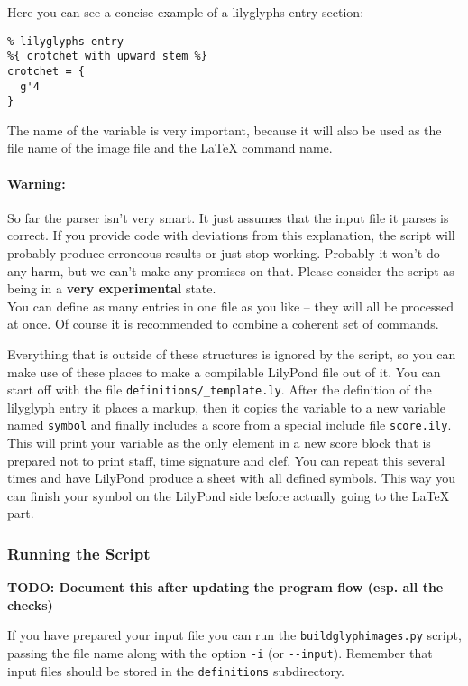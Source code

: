 \documentclass{article}
\begin{document}
Here you can see a concise example of a lilyglyphs entry section:

\begin{verbatim}
% lilyglyphs entry
%{ crotchet with upward stem %}
crotchet = {
  g'4
}
\end{verbatim}
The name of the variable is very important, because it will also be used as the file name of the image file and the \LaTeX{} command name.

\paragraph*{Warning:}
So far the parser isn't very smart.
It just assumes that the input file it parses is correct.
If you provide code with deviations from this explanation, the script will probably produce erroneous results or just stop working.
Probably it won't do any harm, but we can't make any promises on that.
Please consider the script as being in a \textbf{very experimental} state.\\


You can define as many entries in one file as you like -- they will all be processed at once. 
Of course it is recommended to combine a coherent set of commands.

Everything that is outside of these structures is ignored by the script, so you can make use of these places to make a compilable LilyPond file out of it.
You can start off with the file \texttt{definitions/\_template.ly}.
After the definition of the lilyglyph entry it places a markup, then it copies the variable to a new variable named \texttt{symbol} and finally includes a score from a special include file \texttt{score.ily}.
This will print your variable as the only element in a new score block that is prepared not to print staff, time signature and clef.
You can repeat this several times and have LilyPond produce a sheet with all defined symbols.
This way you can finish your symbol on the LilyPond side before actually going to the \LaTeX{} part.


\subsubsection{Running the Script}
\label{subsubsec:BGI_running}

\textbf{TODO: Document this after updating the program flow (esp. all the checks)}

\bigskip

If you have prepared your input file you can run the \texttt{buildglyphimages.py} script, passing the file name along with the option \verb|-i| (or \verb|--input|). Remember that input files should be stored in the \texttt{definitions} subdirectory.
\end{document}

